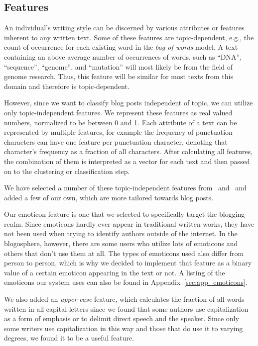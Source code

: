 \subsection{Features}
\label{sec:features}

An individual's writing style can be discerned by various attributes or features inherent to any written text.
Some of these features are topic-dependent, e.g., the count of occurrence for each existing word in the \textit{bag of words} model.
A text containing an above average number of occurrences of words, such as ``DNA'', ``sequence'', ``genome'', and ``mutation'' will most likely be from the field of genome research.
Thus, this feature will be similar for most texts from this domain and therefore is topic-dependent.


However, since we want to classify blog posts independent of topic, we can utilize only topic-independent features.
We represent these features as real valued numbers, normalized to be between 0  and 1.
Each attribute of a text can be represented by multiple features, for example the frequency of punctuation characters can have one feature per punctuation character, denoting that character's frequency as a fraction of all characters.
After calculating all features, the combination of them is interpreted as a vector for each text and then passed on to the clustering or classification step.


We have selected a number of these topic-independent features from~\cite{madigan2005author} and~\cite{narayanan2012feasibility} and added a few of our own, which are more tailored towards blog posts.


Our emoticon feature is one that we selected to specifically target the blogging realm.
Since emoticons hardly ever appear in traditional written works, they have not been used when trying to identify authors outside of the internet.
In the blogosphere, however, there are some users who utilize lots of emoticons and others that don't use them at all.
The types of emoticons used also differ from person to person, which is why we decided to implement that feature as a binary value of a certain emoticon appearing in the text or not.
A listing of the emoticons our system uses can also be found in Appendix~\ref{sec:app_emoticons}.


We also added an \textit{upper case} feature, which calculates the fraction of all words written in all capital letters since we found that some authors use capitalization as a form of emphasis or to delimit direct speech and the speaker.
Since only some writers use capitalization in this way and those that do use it to varying degrees, we found it to be a useful feature.


